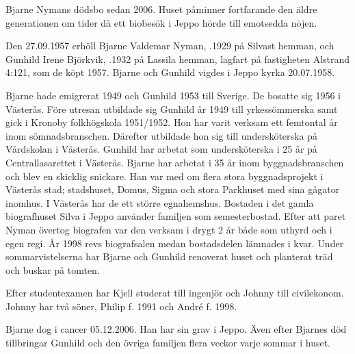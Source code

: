 

Bjarne Nymans dödsbo sedan 2006. Huset påminner fortfarande den äldre generationen om tider då ett biobesök i Jeppo hörde till emotsedda nöjen.\jhvspace{}


Den 27.09.1957 erhöll Bjarne Valdemar Nyman, .1929 på Silvast hemman, och Gunhild Irene Björkvik, .1932 på Lassila hemman, lagfart på fastigheten Alstrand 4:121, som de köpt 1957. Bjarne och Gunhild vigdes i Jeppo kyrka 20.07.1958.

Bjarne	hade emigrerat 1949 och Gunhild 1953 till Sverige. De	bosatte sig 1956 i Västerås. Före utresan utbildade sig Gunhild år 1949 till yrkessömmerska samt gick i Kronoby folkhögskola 1951/1952. Hon har varit verksam ett femtontal 		år inom sömnadsbranschen. Därefter utbildade hon sig till	undersköterska på Vårdskolan i Västerås. Gunhild har arbetat som undersköterska i 25 år på Centrallasarettet i	Västerås. Bjarne har arbetat i 35 år inom byggnadsbranschen	och blev en skicklig snickare. Han var med om flera stora	byggnadsprojekt i Västerås stad; stadshuset, Domus, Sigma	och stora Parkhuset med sina gågator inomhus. I Västerås har de ett större egnahemshus.
Bostaden i det gamla biografhuset Silva i Jeppo använder familjen som semesterbostad. Efter att paret Nyman övertog		biografen var den verksam i drygt 2 år både som uthyrd och i egen regi. År 1998 revs biografsalen medan bostadsdelen 		lämnades i kvar. Under sommarvistelserna har Bjarne och Gunhild renoverat huset och planterat träd och buskar på		tomten.
\begin{jhchildren}
  \item {}
  \item {}
\end{jhchildren}
Efter studentexamen har Kjell studerat till ingenjör och Johnny till civilekonom. Johnny har två söner, Philip f. 1991 och André f. 1998.

Bjarne dog i cancer 05.12.2006. Han har sin grav i Jeppo. Även efter Bjarnes död tillbringar Gunhild och den övriga		familjen flera veckor varje sommar i huset.


